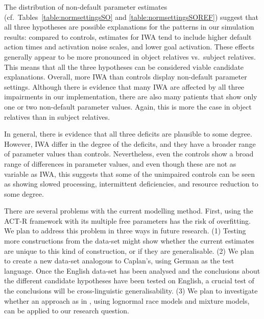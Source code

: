 \documentclass[10pt,letterpaper]{article}
\begin{document}
The distribution of non-default parameter estimates (cf.\ Tables~\ref{table:normsettingsSO} and \ref{table:normsettingsSOREF})
suggest that all three hypotheses are possible explanations for the patterns in our simulation results: compared to controls, estimates for IWA tend to include higher default action times and activation noise scales, and lower goal activation. These effects generally appear to be more pronounced in object relatives vs.\ subject relatives. This means that all the three hypotheses can be considered viable candidate explanations. 
Overall, more IWA than controls display non-default parameter settings. Although there is evidence that many IWA are affected by all three impairments in our implementation, there are also many patients that show only one or two non-default parameter values. Again, this is more the case in object relatives than in subject relatives.

In general, there is evidence that all three deficits are plausible to some degree. However, IWA differ in the degree of the deficits, and they have a broader range of parameter values than controls.
Nevertheless, even the controls show a broad range of differences in parameter values, and even though these are not as variable as IWA, this suggests that some of the unimpaired controls can be seen as showing slowed processing, intermittent deficiencies, and resource reduction to some degree.   

There are several problems with the current modelling method. First, using the ACT-R framework with its multiple free parameters has the risk of overfitting. We plan to address this problem in three ways in future research. (1) Testing more constructions from the  data-set might show whether the current estimates are unique to this kind of construction, or if they are generalisable. (2) We plan to create a new data-set analogous to Caplan's, using German as the test language. Once the English data-set has been analysed and the conclusions about the different candidate hypotheses have been tested on English, a crucial test of the conclusions will be cross-linguistic generalisability.
(3) We plan to investigate whether an approach as in , using lognormal race models and mixture models, can be applied to our research question. 
\end{document}
